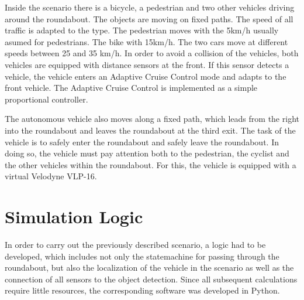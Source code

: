 \documentclass[11pt,oneside,openright]{mpreport}
\begin{document}
Inside the scenario there is a bicycle, a pedestrian and two other vehicles driving around the roundabout. The objects are moving on fixed paths.
The speed of all traffic is adapted to the type. The pedestrian moves with the 5km/h usually asumed for pedestrians.
The bike with 15km/h. The two cars move at different speeds between 25 and 35 km/h. In order to avoid a collision of the vehicles,
both vehicles are equipped with distance sensors at the front. If this sensor detects a vehicle, the vehicle enters an Adaptive Cruise Control mode and adapts to the front vehicle.
The Adaptive Cruise Control is implemented as a simple proportional controller.


The autonomous vehicle also moves along a fixed path, which leads from the right into the roundabout and leaves the roundabout at the third exit. 
The task of the vehicle is to safely enter the roundabout and safely leave the roundabout. In doing so, the vehicle must pay attention both to the pedestrian,
the cyclist and the other vehicles within the roundabout. For this, the vehicle is equipped with a virtual Velodyne VLP-16.

\section{Simulation Logic}


In order to carry out the previously described scenario, a logic had to be developed, which includes not only the statemachine for passing through the roundabout,
but also the localization of the vehicle in the scenario as well as the connection of all sensors to the object detection.
Since all subsequent calculations require little resources, the corresponding software was developed in Python.
\end{document}
